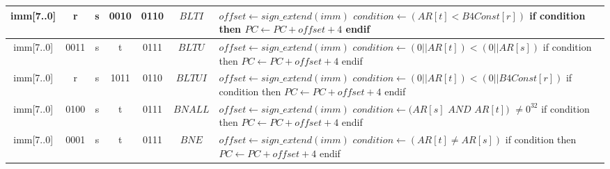 \begin{longtable}{llllllllllllllllllllllll  p{1cm}  p{7cm} | }
        \multicolumn{8}{|c|}{imm[7..0]} & \multicolumn{4}{c|}{r} & \multicolumn{4}{c|}{s} & \multicolumn{4}{c|}{0010} & \multicolumn{4}{c|}{0110} & \multicolumn{1}{c|}{$BLTI$} & $offset \leftarrow sign\_extend(imm)$ \newline $condition \leftarrow (AR[t] < B4Const[r])$ \newline if     condition then \newline $PC \leftarrow PC + offset + 4$ \newline endif\\ \hline
		\multicolumn{8}{|c|}{imm[7..0]} & \multicolumn{4}{c|}{0011} & \multicolumn{4}{c|}{s} & \multicolumn{4}{c|}{t} & \multicolumn{4}{c|}{0111} & \multicolumn{1}{c|}{$BLTU$} & $offset \leftarrow sign\_extend(imm)$ \newline $condition \leftarrow (0||AR[t]) < (0||AR[s])$ \newline if condition then \newline $PC \leftarrow PC + offset + 4$ \newline endif\\ \hline
        \multicolumn{8}{|c|}{imm[7..0]} & \multicolumn{4}{c|}{r} & \multicolumn{4}{c|}{s} & \multicolumn{4}{c|}{1011} & \multicolumn{4}{c|}{0110} & \multicolumn{1}{c|}{$BLTUI$} & $offset \leftarrow sign\_extend(imm)$ \newline $condition \leftarrow (0||AR[t]) < (0||B4Const[r])$ \newline if condition then \newline $PC \leftarrow PC + offset + 4$ \newline endif\\ \hline
       \multicolumn{8}{|c|}{imm[7..0]} & \multicolumn{4}{c|}{0100} & \multicolumn{4}{c|}{s} & \multicolumn{4}{c|}{t} & \multicolumn{4}{c|}{0111} & \multicolumn{1}{c|}{$BNALL$} & $offset \leftarrow sign\_extend(imm)$ \newline $condition \leftarrow (AR[s]$ $AND$ $AR[t])$ $\neq0^{32}$ \newline if condition then \newline $PC \leftarrow PC + offset + 4$ \newline endif\\ \hline
	   \multicolumn{8}{|c|}{imm[7..0]} & \multicolumn{4}{c|}{0001} & \multicolumn{4}{c|}{s} & \multicolumn{4}{c|}{t} & \multicolumn{4}{c|}{0111} & \multicolumn{1}{c|}{$BNE$} & $offset \leftarrow sign\_extend(imm)$ \newline $condition \leftarrow (AR[t] \neq AR[s])$ \newline if condition then \newline $PC \leftarrow PC + offset + 4$ \newline endif\\ \hline

\end{longtable}
